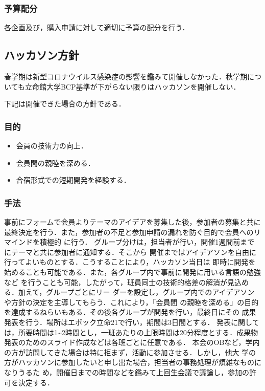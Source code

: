 \subsubsection*{予算配分}
各企画及び，購入申請に対して適切に予算の配分を行う．


\subsection*{ハッカソン方針}
春学期は新型コロナウイルス感染症の影響を鑑みて開催しなかった．秋学期についても立命館大学BCP基準が下がらない限りはハッカソンを開催しない．

下記は開催できた場合の方針である．

\subsubsection*{目的}
\begin{itemize}
    \item 会員の技術力の向上．
    \item 会員間の親睦を深める．
    \item 合宿形式での短期開発を経験する．
\end{itemize}

\subsubsection*{手法}
事前にフォームで会員よりテーマのアイデアを募集した後，参加者の募集と共に最終決定を行う．また，参加者の不足と参加申請の漏れを防ぐ目的で会員へのリマインドを積極的
に行う．
グループ分けは，担当者が行い，開催1週間前までにテーマと共に参加者に通知する．そこから
開催まではアイデアソンを自由に行ってよいものとする．こうすることにより，ハッカソン当日は
即時に開発を始めることも可能である．また，各グループ内で事前に開発に用いる言語の勉強など
を行うことも可能，したがって，班員同士の技術的格差の解消が見込める．加えて，グループごとにリー
ダーを設定し，グループ内でのアイデアソンや方針の決定を主導してもらう．これにより，「会員間
の親睦を深める」の目的を達成するねらいもある．その後各グループが開発を行い，最終日にその
成果発表を行う．場所はエポック立命21で行い，期間は3日間とする．
発表に関しては，所要時間は1\~{}2時間とし，一班あたりの上限時間は20分程度とする．成果物
発表のためのスライド作成などは各班ごとに任意である．
本会のOBなど，学内の方が訪問してきた場合は特に拒まず，活動に参加させる．しかし，他大
学の方がハッカソンに参加したいと申し出た場合，担当者の事務処理が煩雑なものになりうるた
め，開催日までの時間などを鑑みて上回生会議で議論し，参加の許可を決定する．




